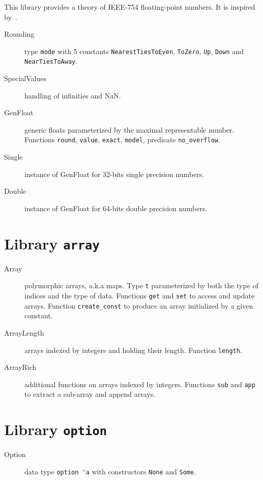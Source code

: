 This library provides a theory of IEEE-754 floating-point numbers. It
is inspired by~\cite{ayad10ijcar}.

\begin{description}
\item[Rounding] type \verb|mode| with 5 constants
  \verb|NearestTiesToEven|, \verb|ToZero|, \verb|Up|, \verb|Down| and
  \verb|NearTiesToAway|.
\item[SpecialValues] handling of infinities and NaN.
\item[GenFloat] generic floats parameterized by the maximal
  representable number. Functions \verb|round|, \verb|value|,
  \verb|exact|, \verb|model|, predicate \verb|no_overflow|.
\item[Single] instance of GenFloat for 32-bits single precision numbers.
\item[Double] instance of GenFloat for 64-bits double precision numbers.
\end{description}


\section{Library \texttt{array}}

\begin{description}

\item[Array] polymorphic arrays, a.k.a maps. Type \verb|t|
  parameterized by both the type of indices and the type of
  data. Functions \verb|get| and \verb|set| to access and update
  arrays. Function \verb|create_const| to produce an array initialized
  by a given constant.

\item[ArrayLength] arrays indexed by integers and holding their
  length. Function \verb|length|.

\item[ArrayRich] additional functions on arrays indexed by
  integers. Functions \verb|sub| and \verb|app| to extract a sub-array
  and append arrays.

\end{description}

\section{Library \texttt{option}}

\begin{description}
\item[Option] data type \verb|option 'a| with constructors \verb|None| and
  \verb|Some|.
\end{description}


